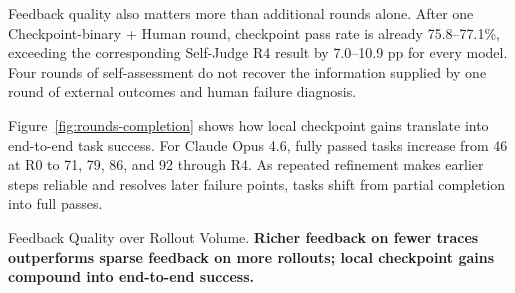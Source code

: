 Feedback quality also matters more than additional rounds alone. After one
Checkpoint-binary + Human round, checkpoint pass rate is already
75.8--77.1\%, exceeding the corresponding Self-Judge R4 result by
7.0--10.9 pp for every model. Four rounds of self-assessment do not recover
the information supplied by one round of external outcomes and human failure
diagnosis.

Figure~\ref{fig:rounds-completion} shows how local checkpoint gains translate
into end-to-end task success. For Claude Opus 4.6, fully passed tasks increase
from 46 at R0 to 71, 79, 86, and 92 through R4. As repeated refinement makes
earlier steps reliable and resolves later failure points, tasks shift from
partial completion into full passes.

\begin{promptwrapper}{Feedback Quality over Rollout Volume.}
\textbf{Richer feedback on fewer traces outperforms sparse feedback on more
rollouts; local checkpoint gains compound into end-to-end success.}
\end{promptwrapper}

